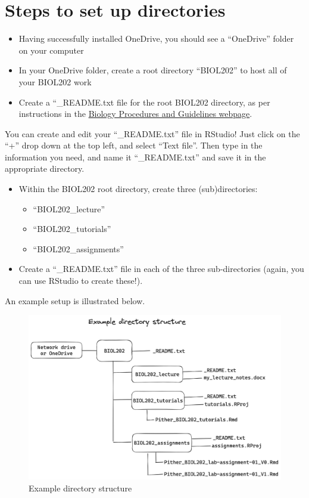 \documentclass[
]{book}
\providecommand{\tightlist}{%
  \setlength{\itemsep}{0pt}\setlength{\parskip}{0pt}}
\begin{document}
\section{Steps to set up directories}\label{setup_dirs}

\begin{itemize}
\tightlist
\item
  Having successfully installed OneDrive, you should see a ``OneDrive'' folder on your computer
\item
  In your OneDrive folder, create a root directory ``BIOL202'' to host all of your BIOL202 work
\item
  Create a ``\_README.txt file for the root BIOL202 directory, as per instructions in the \href{https://ubco-biology.github.io/Procedures-and-Guidelines/readme-files-and-data-dictionaries.html}{Biology Procedures and Guidelines webpage}.
\end{itemize}

You can create and edit your ``\_README.txt'' file in RStudio! Just click on the ``+'' drop down at the top left, and select ``Text file''. Then type in the information you need, and name it ``\_README.txt'' and save it in the appropriate directory.

\begin{itemize}
\tightlist
\item
  Within the BIOL202 root directory, create three (sub)directories:

  \begin{itemize}
  \tightlist
  \item
    ``BIOL202\_lecture''
  \item
    ``BIOL202\_tutorials''
  \item
    ``BIOL202\_assignments''
  \end{itemize}
\item
  Create a ``\_README.txt'' file in each of the three sub-directories (again, you can use RStudio to create these!).
\end{itemize}

An example setup is illustrated below.

\begin{figure}
\includegraphics[width=41.99in]{./more/BIOL202_directory_structure} \caption{Example directory structure}\label{fig:unnamed-chunk-9}
\end{figure}
\end{document}
